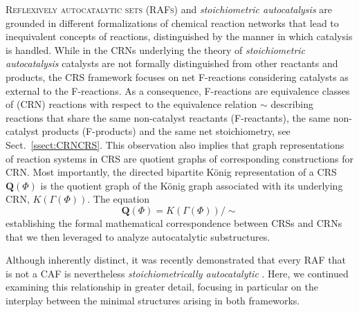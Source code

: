 \documentclass[pdflatex]{sn-jnl}
\theoremstyle{thmstyleone}%
\theoremstyle{examplesty}%
\theoremstyle{thmstylethree}%
\newcommand{\king}{K}
\newcommand{\queen}{\mathbf{Q}}
\newcommand{\PFS}[1]{\begingroup\color{cyan}#1\endgroup}
\begin{document}
\PFS{\textsc{Reflexively autocatalytic sets (RAFs)} and
  \emph{stoichiometric autocatalysis} are grounded in different
  formalizations of chemical reaction networks that lead to inequivalent
  concepts of reactions, distinguished by the manner in which catalysis is
  handled. While in the CRNs underlying the theory of \emph{stoichiometric
  autocatalysis} catalysts are not formally distinguished from other
  reactants and products, the CRS framework focuses on net F-reactions
  considering catalysts as external to the F-reactions. As a consequence,
  F-reactions are equivalence classes of (CRN) reactions with respect to
  the equivalence relation $\sim$ describing reactions that share the same
  non-catalyst reactants (F-reactants), the same non-catalyst products
  (F-products) and the same net stoichiometry, see
  Sect.~\ref{ssect:CRNCRS}.  This observation also implies that graph
  representations of reaction systems in CRS are quotient graphs of
  corresponding constructions for CRN. Most importantly, the directed
  bipartite K\"onig representation of a CRS $\queen(\Phi)$ is the quotient
  graph of the K\"onig graph associated with its underlying CRN,
  $\king(\Gamma(\Phi))$. The equation
  \begin{equation*}
    \queen(\Phi) = \king(\Gamma(\Phi))/\sim
  \end{equation*}
  establishing the formal mathematical correspondence between CRSs and CRNs
  that we then leveraged to analyze autocatalytic substructures.}
  


Although inherently distinct, it was recently demonstrated that
every \textsc{RAF} that is not a \textsc{CAF} is nevertheless
\emph{stoichiometrically autocatalytic} \cite{golnik_bridging_2026}. Here,
we continued examining this relationship in greater detail, focusing in
particular on the interplay between the minimal structures arising in both
frameworks.
\end{document}
